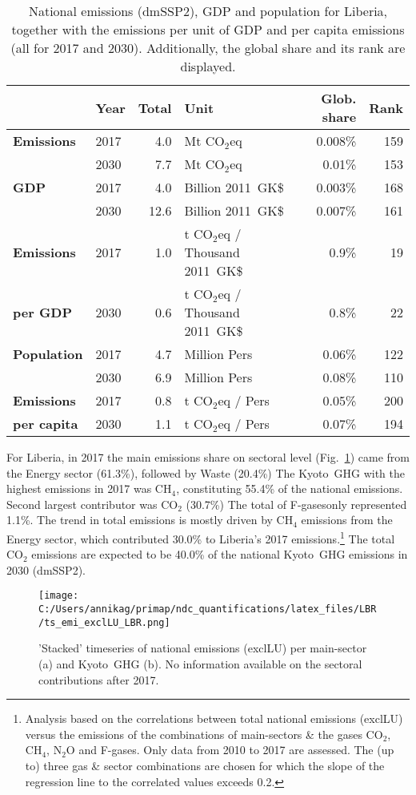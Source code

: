 \documentclass[12pt]{article}
\begin{document}
 \begin{table}[H]
 \centering
 \caption{National emissions (dmSSP2), GDP and population for Liberia, together with the emissions per unit of GDP and per capita emissions (all for 2017 and 2030). 
 Additionally, the global share and its rank are displayed.}
 \label{tab:overview}
 \begin{tabular}{l || l r l r r}
 \bfseries  & \bfseries Year & \bfseries Total & \bfseries Unit & \bfseries Glob. share & \bfseries Rank \tabularnewline \hline \hline
 \bfseries Emissions & 2017 & 4.0 & Mt CO$_2$eq & 0.008\% & 159 \tabularnewline 
 \bfseries  & 2030 & 7.7 & Mt CO$_2$eq & 0.01\% & 153 \tabularnewline \hline
 \bfseries GDP & 2017 & 4.0 & Billion 2011~GK\$ & 0.003\% & 168 \tabularnewline 
 \bfseries  & 2030 & 12.6 & Billion 2011~GK\$ & 0.007\% & 161 \tabularnewline \hline
 \bfseries Emissions & 2017 & 1.0 & t CO$_2$eq / Thousand 2011~GK\$ & 0.9\% & 19 \tabularnewline 
 \bfseries per GDP & 2030 & 0.6 & t CO$_2$eq / Thousand 2011~GK\$ & 0.8\% & 22 \tabularnewline \hline
 \bfseries Population & 2017 & 4.7 & Million Pers & 0.06\% & 122 \tabularnewline 
 \bfseries  & 2030 & 6.9 & Million Pers & 0.08\% & 110 \tabularnewline \hline
 \bfseries Emissions & 2017 & 0.8 & t CO$_2$eq /  Pers & 0.05\% & 200 \tabularnewline 
 \bfseries per capita & 2030 & 1.1 & t CO$_2$eq /  Pers & 0.07\% & 194 \tabularnewline 
 \end{tabular}
 \end{table}

 For Liberia, in 2017 the main emissions share on sectoral level (Fig.~\ref{fig:tsEmi}) came from the Energy sector (61.3\%), followed by Waste (20.4\%)
 The Kyoto~GHG with the highest emissions in 2017 was CH$_4$, constituting  55.4\% of the national emissions. 
 Second largest contributor was CO$_2$ (30.7\%)
 The total of F-gasesonly represented 1.1\%.
 The trend in total emissions is mostly driven by CH$_4$ emissions from the Energy sector, which contributed 30.0\% to Liberia's 2017 emissions.\footnote{Analysis based on the correlations between total national emissions (exclLU) versus the emissions of the combinations of main-sectors \& the gases CO$_2$, CH$_4$, N$_2$O and F-gases. 
 Only data from 2010 to 2017 are assessed. 
 The (up to) three gas \& sector combinations are chosen for which the slope of the regression line to the correlated values exceeds 0.2.}
 The total CO$_2$ emissions are expected to be 40.0\% of the national Kyoto~GHG emissions in 2030 (dmSSP2).

 \begin{figure}[H]
 \centering
 \texttt{[image: C:/Users/annikag/primap/ndc\_quantifications/latex\_files/LBR/ts\_emi\_exclLU\_LBR.png]}
 \caption{'Stacked' timeseries of national emissions (exclLU) per main-sector (a) and Kyoto~GHG (b). 
 No information available on the sectoral contributions after 2017.}
 \label{fig:tsEmi}
 \end{figure}
\end{document}
